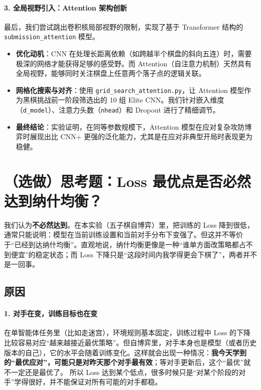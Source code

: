 \documentclass{article}
\begin{document}
\paragraph{3. 全局视野引入：Attention 架构创新}
最后，我们尝试跳出卷积核局部视野的限制，实现了基于 Transformer 结构的 \texttt{submission\_attention} 模型。
\begin{itemize}
    \item \textbf{优化动机}：CNN 在处理长距离依赖（如跨越半个棋盘的斜向五连）时，需要极深的网络才能获得足够的感受野。而 Attention（自注意力机制）天然具有全局视野，能够同时关注棋盘上任意两个落子点的逻辑关联。
    \item \textbf{网格化搜索与对齐}：使用 \texttt{grid\_search\_attention.py}，让 Attention 模型作为黑棋挑战前一阶段筛选出的 10 组 Elite CNN。我们针对嵌入维度（\texttt{d\_model}）、注意力头数（\texttt{nhead}）和 Dropout 进行了精细调节。
    \item \textbf{最终结论}：实验证明，在同等参数规模下，Attention 模型在应对复杂攻防博弈时展现出比 CNN+ 更强的泛化能力，尤其是在应对非典型开局时表现更为稳健。
\end{itemize}


\section{（选做）思考题：Loss 最优点是否必然达到纳什均衡？}


我们认为\textbf{不必然达到}。在本实验（五子棋自博弈）里，把训练的 Loss 降到很低，通常只能说明：模型在当前训练设置和当前对手分布下变强了。但这并不等价于“已经到达纳什均衡”。直观地说，纳什均衡更像是一种“谁单方面改策略都占不到便宜”的稳定状态；而 Loss 下降只是“这段时间内我学得更会下棋了”，两者并不是一回事。

\subsection{原因}

\paragraph{1. 对手在变，训练目标也在变}
在单智能体任务里（比如走迷宫），环境规则基本固定，训练过程中 Loss 的下降比较容易对应“越来越接近最优策略”。但自博弈里，对手本身也是模型（或者历史版本的自己），它的水平会随着训练变化。这样就会出现一种情况：\textbf{我今天学到的“最优应对”，可能只是对昨天那个对手最有效}；等对手更新后，这个“最优”就不一定还是最优了。  
所以 Loss 达到某个低点，很多时候只是“对某个阶段的对手”学得很好，并不能保证对所有可能的对手都稳。
\end{document}
